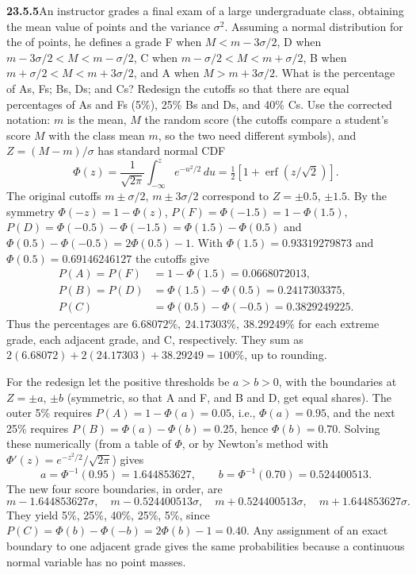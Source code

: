 \par\bigskip
\noindent\textbf{23.5.5}\quad An instructor grades a final exam
of a large undergraduate class, obtaining the mean value of
points  and the variance $\sigma^{2}$. Assuming a
normal distribution for the  of
points, he defines a grade F when $M<m-3\sigma/2$, D when
$m-3\sigma/2<M<m-\sigma/2$, C when $m-\sigma/2<M<m+\sigma/2$, B
when $m+\sigma/2<M<m+3\sigma/2$, and A when $M>m+3\sigma/2$.
What is the percentage of As, Fs; Bs, Ds; and Cs? Redesign the
cutoffs so that there are equal percentages of As and Fs (5\%),
25\% Bs and Ds, and 40\% Cs. 
\solution
Use the corrected notation: $m$ is the mean, $M$ the random score (the
cutoffs compare a student's score $M$ with the class mean $m$, so the
two need different symbols), and $Z=(M-m)/\sigma$ has standard normal CDF
\[
\Phi(z)=\frac1{\sqrt{2\pi}}\int_{-\infty}^{z}e^{-u^2/2}\,du
=\tfrac12[1+\operatorname{erf}(z/\sqrt2)].
\]
The original cutoffs $m\pm\sigma/2$, $m\pm3\sigma/2$ correspond to
$Z=\pm0.5$, $\pm1.5$. By the symmetry $\Phi(-z)=1-\Phi(z)$,
$P(F)=\Phi(-1.5)=1-\Phi(1.5)$, $P(D)=\Phi(-0.5)-\Phi(-1.5)
=\Phi(1.5)-\Phi(0.5)$ and $\Phi(0.5)-\Phi(-0.5)=2\Phi(0.5)-1$. With
$\Phi(1.5)=0.93319279873$ and $\Phi(0.5)=0.69146246127$ the cutoffs give
\begin{align*}
P(A)=P(F)&=1-\Phi(1.5)=0.0668072013,\\
P(B)=P(D)&=\Phi(1.5)-\Phi(0.5)=0.2417303375,\\
P(C)&=\Phi(0.5)-\Phi(-0.5)=0.3829249225.
\end{align*}
Thus the percentages are $\boxed{6.68072\%,\ 24.17303\%,\ 38.29249\%}$
for each extreme grade, each adjacent grade, and C, respectively.
They sum as $2(6.68072)+2(24.17303)+38.29249=100\%$, up to rounding.

For the redesign let the positive thresholds be $a>b>0$, with the
boundaries at $Z=\pm a$, $\pm b$ (symmetric, so that A and F, and B and
D, get equal shares). The outer 5\% requires $P(A)=1-\Phi(a)=0.05$,
i.e., $\Phi(a)=0.95$, and the next 25\% requires
$P(B)=\Phi(a)-\Phi(b)=0.25$, hence $\Phi(b)=0.70$.
Solving these numerically (from a table of $\Phi$, or by Newton's
method with $\Phi'(z)=e^{-z^2/2}/\sqrt{2\pi}$) gives
\[
a=\Phi^{-1}(0.95)=1.644853627,\qquad
b=\Phi^{-1}(0.70)=0.524400513.
\]
The new four score boundaries, in order, are
\[
\boxed{m-1.644853627\sigma,\quad m-0.524400513\sigma,
\quad m+0.524400513\sigma,\quad m+1.644853627\sigma}.
\]
They yield 5\%, 25\%, 40\%, 25\%, 5\%, since
$P(C)=\Phi(b)-\Phi(-b)=2\Phi(b)-1=0.40$. Any assignment of an exact
boundary to one adjacent grade gives the same probabilities because
a continuous normal variable has no point masses.


